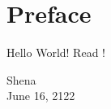 \documentclass[a4paper,12pt]{article}
\begin{document}
\section*{Preface}
Hello World! Read \cite{author:book-title}!

\begin{flushright}
	Shena\\
	June 16, 2122
\end{flushright}
\end{document}
